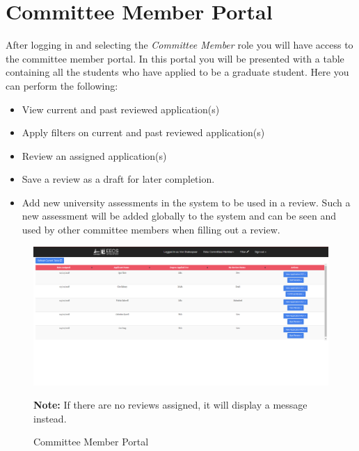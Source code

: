 \documentclass[fontsize=12pt,paper=letter,twoside]{scrartcl}
\begin{document}
\clearpage
\section{Committee Member Portal}

After logging in and selecting the \emph{Committee Member} role you will have access to the committee member portal. In this portal you will be presented with a table containing all the students who have applied to be a graduate student. Here you can perform the following:
\begin{itemize}
\item View current and past reviewed application(s)
\item Apply filters on current and past reviewed application(s)
\item Review an assigned application(s)
\item Save a review as a draft for later completion.
\item Add new university assessments in the system to be used in a review. Such a new assessment will be added globally to the system and can be seen and used by other committee members when filling out a review.
\end{itemize} 

\begin{figure}[!htb]
\begin{center}
\includegraphics[width=.8\textwidth]{images/default_table.png}
\end{center}
\caption{Committee Member Portal}
\label{fig:cm_portal}
\textbf{Note:} If there are no reviews assigned, it will display a message instead. 
\end{figure}

\newpage
\end{document}
